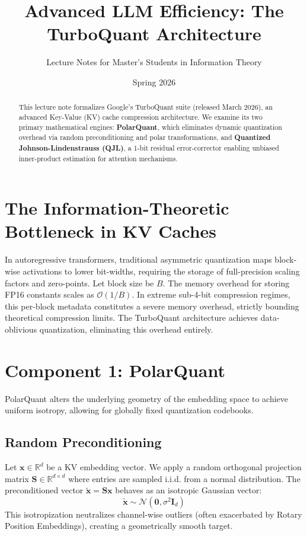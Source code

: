 \documentclass[11pt]{article}
\title{Advanced LLM Efficiency: The TurboQuant Architecture}
\author{Lecture Notes for Master's Students in Information Theory}
\date{Spring 2026}
\begin{document}
\maketitle

\begin{abstract}
This lecture note formalizes Google's TurboQuant suite (released March 2026), an advanced Key-Value (KV) cache compression architecture. We examine its two primary mathematical engines: \textbf{PolarQuant}, which eliminates dynamic quantization overhead via random preconditioning and polar transformations, and \textbf{Quantized Johnson-Lindenstrauss (QJL)}, a 1-bit residual error-corrector enabling unbiased inner-product estimation for attention mechanisms.
\end{abstract}

\section{The Information-Theoretic Bottleneck in KV Caches}
In autoregressive transformers, traditional asymmetric quantization maps block-wise activations to lower bit-widths, requiring the storage of full-precision scaling factors and zero-points. Let block size be $B$. The memory overhead for storing FP16 constants scales as $\mathcal{O}(1/B)$. In extreme sub-4-bit compression regimes, this per-block metadata constitutes a severe memory overhead, strictly bounding theoretical compression limits. The TurboQuant architecture achieves data-oblivious quantization, eliminating this overhead entirely.

\section{Component 1: PolarQuant}
PolarQuant alters the underlying geometry of the embedding space to achieve uniform isotropy, allowing for globally fixed quantization codebooks.

\subsection{Random Preconditioning}
Let $\mathbf{x} \in \mathbb{R}^d$ be a KV embedding vector. We apply a random orthogonal projection matrix $\mathbf{S} \in \mathbb{R}^{d \times d}$ where entries are sampled i.i.d. from a normal distribution. The preconditioned vector $\tilde{\mathbf{x}} = \mathbf{S}\mathbf{x}$ behaves as an isotropic Gaussian vector:
\begin{equation}
\tilde{\mathbf{x}} \sim \mathcal{N}(\mathbf{0}, \sigma^2\mathbf{I}_d)
\end{equation}
This isotropization neutralizes channel-wise outliers (often exacerbated by Rotary Position Embeddings), creating a geometrically smooth target.
\end{document}

